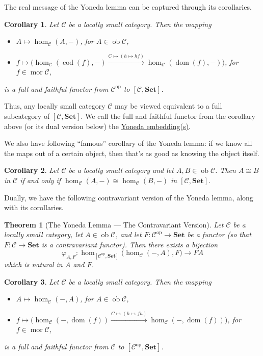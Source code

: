 \documentclass[a4paper,11pt]{article}
\theoremstyle{break_italics}
\newtheorem*{theorem*}{Theorem}
\newtheorem*{corollary*}{Corollary}
\theoremstyle{break_upright}
\theoremstyle{remark}
\newcommand{\ob}{\operatorname{ob}}
\newcommand{\mor}{\operatorname{mor}}
\newcommand{\C}{\mathcal{C}}
\newcommand{\Set}{\mathbf{Set}}
\newcommand{\op}{\mathrm{op}}
\newcommand{\dom}{\operatorname{dom}}
\newcommand{\cod}{\operatorname{cod}}
\begin{document}
The real message of the Yoneda lemma can be captured through its corollaries.

\begin{corollary*}
	Let $\C$ be a locally small category. Then the mapping
	\begin{itemize}
		\item $A \mapsto \hom_\C(A, -)$, for $A \in \ob\C$,
		\item $f \mapsto \Big(\hom_\C(\cod(f), -) \xrightarrow{C \mapsto (h \mapsto hf)} \hom_\C(\dom(f), -)\Big)$, for $f \in \mor\C$,
	\end{itemize}
	is a full and faithful functor from $\C^\op$ to $[\C, \Set]$.
\end{corollary*}

Thus, any locally small category $\C$ may be viewed equivalent to a full subcategory of $[\C,\Set]$. We call the full and faithful functor from the corollary above (or its dual version below) the \uline{Yoneda embedding(s)}.

We also have following ``famous'' corollary of the Yoneda lemma: if we know all the maps out of a certain object, then that's as good as knowing the object itself.

\begin{corollary*}
Let $\C$ be a locally small category and let $A,B \in \ob\C$. Then $A \cong B$ in $\C$ if and only if $\hom_{\C}(A, -) \cong \hom_{\C}(B,-)$ in $[\C,\Set]$.
\end{corollary*}

Dually, we have the following contravariant version of the Yoneda lemma, along with its corollaries.

\begin{theorem*}[The Yoneda Lemma --- The Contravariant Version]
	Let $\C$ be a locally small category, let $A \in \ob\C$, and let $F \colon \C^\op \to \Set$ be a functor (so that $F \colon \C \to \Set$ is a contravariant functor). Then there exists a bijection
	\[
		\varphi_{A,F} \colon \hom_{[\C^\op,\Set]}\big(\hom_\C(-, A), F\big) \to FA
	\]
	which is natural in $A$ and $F$.
\end{theorem*}

\begin{corollary*}
Let $\C$ be a locally small category. Then the mapping
\begin{itemize}
	\item $A \mapsto \hom_\C(-, A)$, for $A \in \ob\C$,
	\item $f \mapsto \Big(\hom_\C(-,\dom(f)) \xrightarrow{C \mapsto (h \mapsto fh)} \hom_\C(-, \dom(f))\Big)$, for $f \in \mor\C$,
\end{itemize}
is a full and faithful functor from $\C$ to $[\C^\op,\Set]$.
\end{corollary*}
\end{document}
